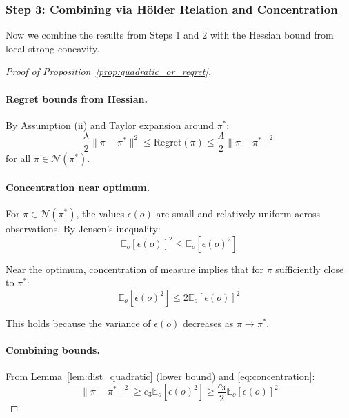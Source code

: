 \subsubsection{Step 3: Combining via Hölder Relation and Concentration}

Now we combine the results from Steps 1 and 2 with the Hessian bound from local strong concavity.

\begin{proof}[Proof of Proposition~\ref{prop:quadratic_or_regret}]

\paragraph{Regret bounds from Hessian.} By Assumption (ii) and Taylor expansion around $\pi^*$:
\begin{equation}
    \frac{\lambda}{2} \|\pi - \pi^*\|^2 \le \text{Regret}(\pi) \le \frac{\Lambda}{2} \|\pi - \pi^*\|^2
    \label{eq:hessian_bound}
\end{equation}
for all $\pi \in \mathcal{N}(\pi^*)$.

\paragraph{Concentration near optimum.} For $\pi \in \mathcal{N}(\pi^*)$, the values $\epsilon(o)$ are small and relatively uniform across observations. By Jensen's inequality:
\begin{equation}
    \mathbb{E}_o[\epsilon(o)]^2 \le \mathbb{E}_o[\epsilon(o)^2]
\end{equation}

Near the optimum, concentration of measure implies that for $\pi$ sufficiently close to $\pi^*$:
\begin{equation}
    \mathbb{E}_o[\epsilon(o)^2] \le 2 \mathbb{E}_o[\epsilon(o)]^2
    \label{eq:concentration}
\end{equation}

This holds because the variance of $\epsilon(o)$ decreases as $\pi \to \pi^*$.

\paragraph{Combining bounds.} From Lemma~\ref{lem:dist_quadratic} (lower bound) and \eqref{eq:concentration}:
\begin{equation}
    \|\pi - \pi^*\|^2 \ge c_3 \mathbb{E}_o[\epsilon(o)^2] \ge \frac{c_3}{2} \mathbb{E}_o[\epsilon(o)]^2
\end{equation}


\end{proof}
